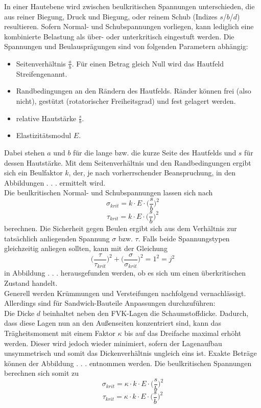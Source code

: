 \noindent In einer Hautebene wird zwischen beulkritischen Spannungen unterschieden, die aus reiner Biegung, Druck und Biegung, oder reinem Schub (Indizes $s$/$b$/$d$) resultieren. Sofern Normal- und Schubspannungen vorliegen, kann lediglich eine kombinierte Belastung als über- oder unterkritisch eingestuft werden. Die Spannungen und Beulausprägungen sind von folgenden Parametern abhängig:
\begin{itemize}
	\item Seitenverhältnis $\frac{a}{b}$. Für einen Betrag gleich Null wird das Hautfeld \glqq Streifen\grqq genannt. 
	\item Randbedingungen an den Rändern des Hautfelds. Ränder können frei (also nicht), gestützt (rotatorischer Freiheitsgrad) und fest gelagert werden.
	\item relative Hautstärke $\frac{s}{b}$.
	\item Elastizitätsmodul $E$.
\end{itemize}
Dabei stehen $a$ und $b$ für die lange bzw. die kurze Seite des Hautfelds und $s$ für dessen Hautstärke. Mit dem Seitenverhältnis und den Randbedingungen ergibt sich ein Beulfaktor $k$, der, je nach vorherrschender Beanspruchung, in den Abbildungen . . .  ermittelt wird. \\
Die beulkritischen Normal- und Schubspannungen lassen sich nach
\begin{equation}
	\sigma_{krit}=k\cdot E\cdot\Big(\frac{s}{b}\Big)^{2}
\end{equation}
\begin{equation}
	\tau_{krit}=k\cdot E\cdot\Big(\frac{s}{b}\Big)^{2}
\end{equation}
berechnen. Die Sicherheit gegen Beulen ergibt sich aus dem Verhältnis zur tatsächlich anliegenden Spannung $\sigma$ bzw. $\tau$. Falls beide Spannungstypen gleichzeitig anliegen sollten, kann mit der Gleichung
\begin{equation}
	\Big(\frac{\tau}{\tau_{krit}}\Big)^{2}+\Big(\frac{\sigma}{\sigma_{krit}}\Big)^{2}=1^{2}=j^{2}
\end{equation}
in Abbildung . . . herausgefunden werden, ob es sich um einen überkritischen Zustand handelt.\\

\noindent Generell werden Krümmungen und Versteifungen nachfolgend vernachlässigt. Allerdings sind für Sandwich-Bauteile Anpassungen durchzuführen:\\
Die Dicke $d$ beinhaltet neben den FVK-Lagen die Schaumstoffdicke. Dadurch, dass diese Lagen nun an den Außenseiten konzentriert sind, kann das Trägheitsmoment mit einem Faktor $\kappa$ bis auf das Dreifache maximal erhöht werden. Dieser wird jedoch wieder minimiert, sofern der Lagenaufbau unsymmetrisch und somit das Dickenverhältnis ungleich eins ist. Exakte Beträge können der Abbildung . . . entnommen werden. Die beulkritischen Spannungen berechnen sich somit zu
\begin{equation}
	\sigma_{krit}=\kappa\cdot k\cdot E\cdot\Big(\frac{s}{b}\Big)^{2}
\end{equation}
\begin{equation}
	\tau_{krit}=\kappa\cdot k\cdot E\cdot\Big(\frac{s}{b}\Big)^{2}
\end{equation}

